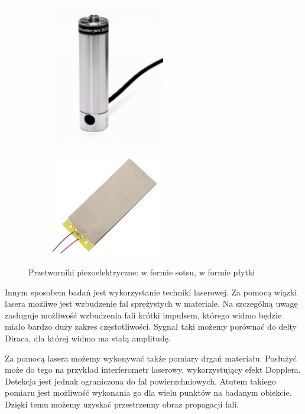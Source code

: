 \begin{figure}[h]
        \centering
        \begin{subfigure}{0.35\textwidth}
                \centering
	     \includegraphics[width=5cm]{Zdjecia/2/piezo_stos}
                \subcaption{\label{subfigure_a}}
        \end{subfigure}
        \begin{subfigure}{0.35\textwidth}
                \centering
	     \includegraphics[width=5cm]{Zdjecia/2/piezo_plytka}
                \subcaption{\label{subfigure_b}}
        \end{subfigure}
        \caption{Przetworniki piezoelektryczne: \protect{} w formie sotsu, \protect{} w formie płytki}
        \label{fig:piezoelektryki}
\end{figure}

\vspace{3mm}

Innym sposobem badań jest wykorzystanie techniki laserowej. Za pomocą wiązki lasera możliwe jest wzbudzenie fal sprężystych w materiale. Na szczególną uwagę zasługuje możliwość wzbudzenia fali krótki impulsem, którego widmo będzie miało bardzo duży zakres częstotliwości. Sygnał taki możemy porównać do delty Diraca, dla której widmo ma stałą amplitudę. 

Za pomocą lasera możemy wykonywać także pomiary drgań materiału. Posłużyć może do tego na przykład interferometr laserowy, wykorzystujący efekt Dopplera. Detekcja jest jednak ograniczona do fal powierzchniowych. Atutem takiego pomiaru jest możliwość wykonania go dla wielu punktów na badanym obiekcie. Dzięki temu możemy uzyskać przestrzenny obraz propagacji fali.


